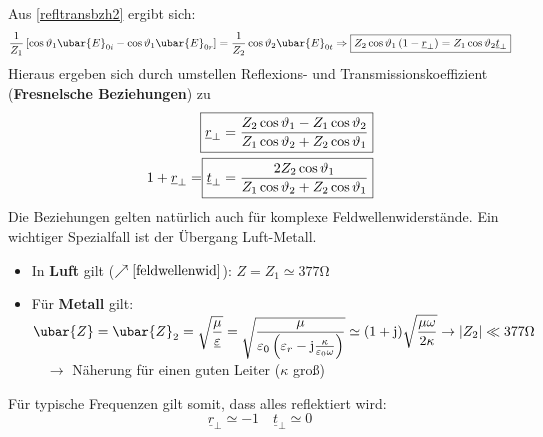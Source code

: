 			   Aus \ref{refltransbzh2} ergibt sich:
			        \begin{equation}
				        \frac{1}{Z_1}\left[   \cos\vartheta_1\ubar{E}_{0i}  -\cos\vartheta_1 \ubar{E}_{0r} \right] = \frac{1}{Z_2} \cos\vartheta_2 \ubar{E}_{0t} \Rightarrow  \boxed{Z_2\cos\vartheta_1\left(1-\underline{r}_\perp\right) = Z_1 \cos\vartheta_2\underline{t}_\perp}
			        \end{equation}
			   Hieraus ergeben sich durch umstellen Reflexions- und Transmissionskoeffizient (\textbf{Fresnelsche Beziehungen}) zu
			        \begin{align}
				        \Aboxed{\underline{r}_\perp                         & = \frac{Z_2\cos\vartheta_1-Z_1\cos\vartheta_2}{Z_1\cos\vartheta_2+Z_2\cos\vartheta_1}} \label{frenselsref}\\
				        1+\underline{r}_\perp = \Aboxed{\underline{t}_\perp & = \frac{2 Z_2\cos\vartheta_1}{Z_1\cos\vartheta_2+Z_2\cos\vartheta_1}}\label{frenselstrans}
			        \end{align}
			  Die Beziehungen gelten natürlich auch für komplexe Feldwellenwiderstände. Ein wichtiger Spezialfall ist der Übergang Luft-Metall. 
			   \begin{itemize}
			   	\item In \textbf{Luft} gilt ($\nearrow\ref{feldwellenwid}$): \(Z=Z_1\simeq 377 \mathrm{\Omega}\)
			   	\item Für \textbf{Metall} gilt: \({\displaystyle \ubar{Z}=\ubar{Z}_2 = \sqrt{\frac{\mu}{\underline{\varepsilon}}}  = \sqrt{\frac{\mu}{\varepsilon_0\left(\varepsilon_r -\mathrm{j}\frac{\kappa}{\varepsilon_0\omega}\right)}} \simeq (1+\mathrm{j})\sqrt{\frac{\mu\omega}{2\kappa}} \to \left|Z_2\right| \ll  377 \mathrm{\Omega}}\)\\
			   	$\quad\to$ Näherung für einen guten Leiter ($\kappa$ groß)
			   \end{itemize} 
			   Für typische Frequenzen gilt somit, dass alles reflektiert wird:
			        \begin{equation}
				         \underline{r}_\perp \simeq -1 \quad \underline{t}_\perp \simeq 0
			        \end{equation}

